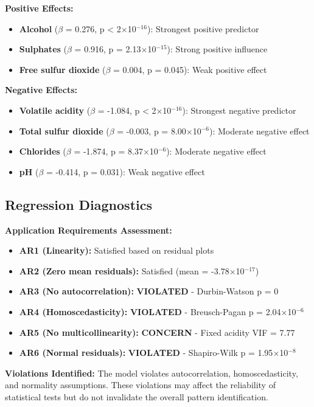 \textbf{Positive Effects:}
\begin{itemize}
\item \textbf{Alcohol} ($\beta$ = 0.276, p < 2$\times$10$^{-16}$): Strongest positive predictor
\item \textbf{Sulphates} ($\beta$ = 0.916, p = 2.13$\times$10$^{-15}$): Strong positive influence
\item \textbf{Free sulfur dioxide} ($\beta$ = 0.004, p = 0.045): Weak positive effect
\end{itemize}

\textbf{Negative Effects:}
\begin{itemize}
\item \textbf{Volatile acidity} ($\beta$ = -1.084, p < 2$\times$10$^{-16}$): Strongest negative predictor
\item \textbf{Total sulfur dioxide} ($\beta$ = -0.003, p = 8.00$\times$10$^{-6}$): Moderate negative effect
\item \textbf{Chlorides} ($\beta$ = -1.874, p = 8.37$\times$10$^{-6}$): Moderate negative effect
\item \textbf{pH} ($\beta$ = -0.414, p = 0.031): Weak negative effect
\end{itemize}

\subsection{Regression Diagnostics}
\textbf{Application Requirements Assessment:}
\begin{itemize}
\item \textbf{AR1 (Linearity):} Satisfied based on residual plots
\item \textbf{AR2 (Zero mean residuals):} Satisfied (mean = -3.78$\times$10$^{-17}$)
\item \textbf{AR3 (No autocorrelation):} \textbf{VIOLATED} - Durbin-Watson p = 0
\item \textbf{AR4 (Homoscedasticity):} \textbf{VIOLATED} - Breusch-Pagan p = 2.04$\times$10$^{-6}$
\item \textbf{AR5 (No multicollinearity):} \textbf{CONCERN} - Fixed acidity VIF = 7.77
\item \textbf{AR6 (Normal residuals):} \textbf{VIOLATED} - Shapiro-Wilk p = 1.95$\times$10$^{-8}$
\end{itemize}

\textbf{Violations Identified:} The model violates autocorrelation, homoscedasticity, and normality assumptions. These violations may affect the reliability of statistical tests but do not invalidate the overall pattern identification.

